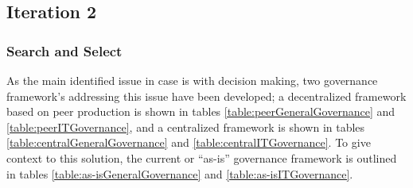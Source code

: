 \subsection{Iteration 2}

\subsubsection*{Search and Select}

As the main identified issue in case is with decision making, two governance framework's  addressing this issue have been developed; a decentralized framework based on peer production is shown in tables \ref{table:peerGeneralGovernance} and \ref{table:peerITGovernance}, and a centralized framework is shown in tables \ref{table:centralGeneralGovernance} and \ref{table:centralITGovernance}. To give context to this solution, the current or ``as-is'' governance framework is outlined in tables \ref{table:as-isGeneralGovernance} and \ref{table:as-isITGovernance}.  

